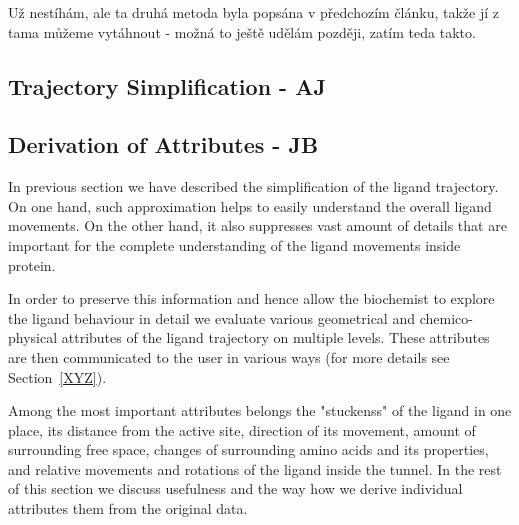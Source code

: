 \documentclass[twocolumn]{bmcart}%
\begin{document}

{\color{red} Už nestíhám, ale ta druhá metoda byla popsána v předchozím článku, takže jí z tama můžeme vytáhnout - možná to ještě udělám později, zatím teda takto.}


\subsection*{Trajectory Simplification - AJ}


\subsection*{Derivation of Attributes - JB}

In previous section we have described the simplification of the ligand trajectory. 
On one hand, such approximation helps to easily understand the overall ligand movements. 
On the other hand, it also suppresses vast amount of details that are important for the complete understanding of the ligand movements inside protein.

In order to preserve this information and hence allow the biochemist to explore the ligand behaviour in detail we evaluate various geometrical and chemico-physical attributes of the ligand trajectory on multiple levels. 
These attributes are then communicated to the user in various ways (for more details {\color{red}see Section~\ref{XYZ}}).

Among the most important attributes belongs the "stuckenss" of the ligand in one place, its distance from the active site, direction of its movement, amount of surrounding free space, changes of surrounding amino acids and its properties, and relative movements and rotations of the ligand inside the tunnel. 
In the rest of this section we discuss usefulness and the way how we derive individual attributes them from the original data.    
\end{document}
